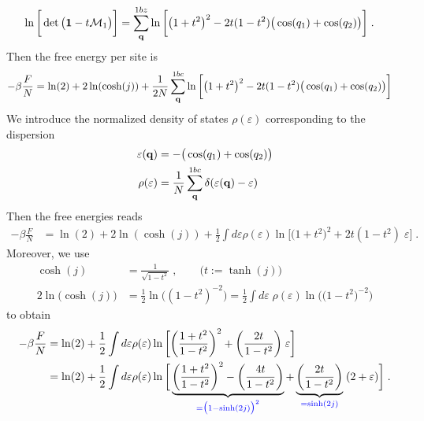 %
\begin{align*}
\ln
\bigg[
\det \big(
\mathbf 1- t \mathcal{M}_{1} 
\big)\bigg] &=\sum_{\mathbf q}^{1bz}
\ln
\bigg[ 
\big( 1+t^{2} \big)^{2}
-2t (1-t^{2}) 
\big( \cos(q_{1})+\cos(q_{2})
\big) 
\bigg]\;.
\end{align*}
%
Then the free energy per site is 
%
\begin{align}\label{eq:}
-\beta\frac{F}{N} &= \ln(2) + 2\ln(\cosh(j)) +\frac{1}{2N}\sum_{\mathbf q}^{1bc}
\ln\bigg[ \big( 1+t^{2} \big)^{2}-2t (1-t^{2}) \big( \cos(q_{1})+\cos(q_{2}) \big) \bigg]
\end{align}
%
We introduce the normalized density of states $\rho(\varepsilon)$ corresponding to the dispersion
%
\begin{align}\label{eq:ising:dispersion}
 \varepsilon(\mathbf q) &= - \big( \cos(q_{1})+\cos(q_{2} ) \big) \\
 \rho(\varepsilon) &= \frac{1}{N}\sum_{\mathbf q}^{1bc} \delta(\varepsilon(\mathbf q) - \varepsilon)
\end{align}
%
Then the free  energies reads
%
\begin{align}\label{eq:}
-\beta\frac{F}{N} &= \ln(2) + 2\ln(\cosh(j)) +\frac{1}{2}\int d\varepsilon \rho(\varepsilon)
\ln\big[ \big( 1+t^{2} \big)^{2}+2t (1-t^{2}) \;\varepsilon \big]\;.
\end{align}
%
Moreover, we use
%
\begin{align*}
\cosh(j) &=\frac{1}{\sqrt{1-t^{2}}}\;,\qquad \big(t:=\tanh(j)\big)\\
2 \ln\big(  \cosh(j)\big) &= \frac{1}{2}\ln\big( (1-t^{2})^{-2} \big)
= \frac{1}{2} \int d\varepsilon\; \rho(\varepsilon)  \ln\big(\big( 1-t^{2} \big)^{-2}\big)
\end{align*}
%
to obtain
\begin{align*}
-\beta\frac{F}{N} &= \ln(2) +\frac{1}{2}\int d\varepsilon \rho(\varepsilon)
\ln\bigg[ \bigg( \frac{1+t^{2}}{1-t^{2}} \bigg)^{2}+ \bigg(\frac{2t}{1-t^{2}}\bigg) \;\varepsilon\bigg]\\
&= \ln(2) +\frac{1}{2}\int d\varepsilon \rho(\varepsilon)
\ln\bigg[\underbrace{
 \bigg( \frac{1+t^{2}}{1-t^{2}} \bigg)^{2}-  \bigg(\frac{4t}{1-t^{2}}\bigg)
}_{\color{blue} = \big( 1-\sinh(2j) \big)^{2}}+ \underbrace{
\bigg(\frac{2t}{1-t^{2}}\bigg)
}_{\color{blue} = \sinh(2j)} \;(2+\varepsilon) \bigg]\;.
\end{align*}
%
%
